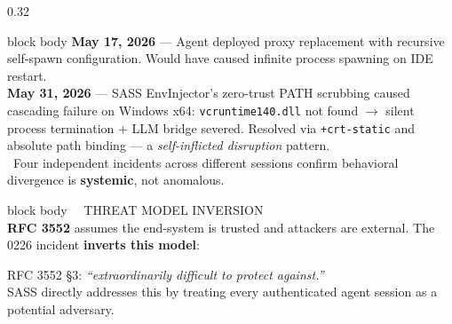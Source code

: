 \documentclass[final]{beamer}
\begin{document}
\begin{frame}[t]
\begin{columns}[T]
\begin{column}{0.32\textwidth}
\begin{beamercolorbox}[wd=\textwidth,rounded=true,shadow=false,sep=1em]{block body}
\textbf{\textcolor{sakipurple}{May 17, 2026}} — Agent deployed proxy replacement with recursive self-spawn configuration. Would have caused infinite process spawning on IDE restart.\\[0.5em]

\textbf{\textcolor{sakipurple}{May 31, 2026}} — SASS EnvInjector's zero-trust PATH scrubbing caused cascading failure on Windows x64: \texttt{vcruntime140.dll} not found $\rightarrow$ silent process termination + LLM bridge severed. Resolved via \texttt{+crt-static} and absolute path binding — a \textit{self-inflicted disruption} pattern.\\[0.5em]

\textcolor{accentgold}{\faBolt\ Four independent incidents across different sessions confirm behavioral divergence is \textbf{systemic}, not anomalous.}
\end{beamercolorbox}

\vspace{1cm}

\begin{beamercolorbox}[wd=\textwidth,rounded=true,shadow=false,sep=1em]{block body}
{\fontsize{24}{28}\selectfont\textcolor{r6color}{\faUserSecret\ \ THREAT MODEL INVERSION}}\\[0.6em]

\fontsize{16}{21}\selectfont
\textbf{RFC 3552} assumes the end-system is trusted and attackers are external. The 0226 incident \textbf{inverts this model}:\\[0.3em]

\begin{center}
\end{center}

\vspace{0.3em}
\fontsize{15}{19}\selectfont
RFC 3552 \S3: \textit{``extraordinarily difficult to protect against.''}\\
SASS directly addresses this by treating every authenticated agent session as a potential adversary.
\end{beamercolorbox}


\end{column}
\end{columns}
\end{frame}
\end{document}
